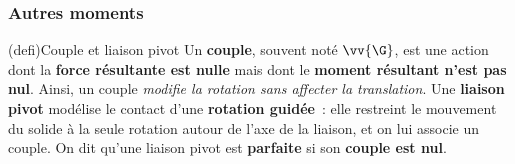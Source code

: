 \documentclass[../../main/main.tex]{subfiles}
\begin{document}
\subsubsection{Autres moments}
\begin{tcb*}[sidebyside, sidebyside align=top](defi){Couple et liaison pivot}
	Un \textbf{couple}, souvent noté $\vv{\G}$, est une action dont la
	\textbf{force résultante est nulle} mais dont le \textbf{moment résultant
		n'est pas nul}. Ainsi, un couple \textit{modifie la rotation sans affecter la
		translation}.
	\tcblower
	Une \textbf{liaison pivot} modélise le contact d'une \textbf{rotation
		guidée}~: elle restreint le mouvement du solide à la seule rotation autour de
	l'axe de la liaison, et on lui associe un couple.
	\smallbreak
	On dit qu'une liaison pivot est \textbf{parfaite} si son \textbf{couple est
		nul}.
\end{tcb*}
\end{document}
